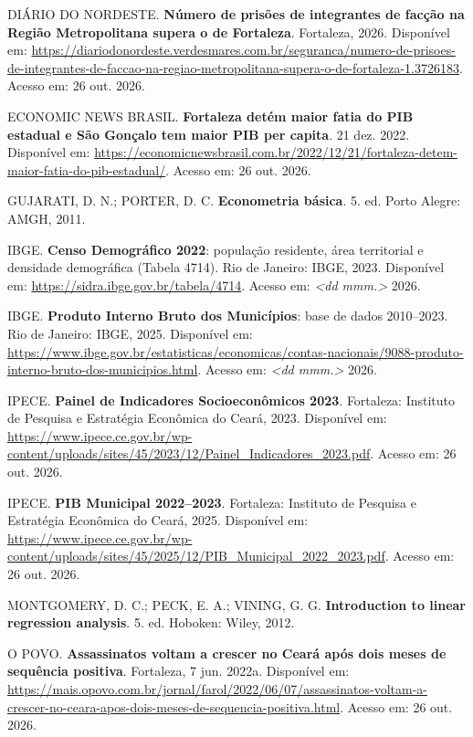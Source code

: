 \documentclass[12pt,a4paper]{article}
\begin{document}
\begin{description}
		\item DIÁRIO DO NORDESTE. \textbf{Número de prisões de integrantes de facção na Região Metropolitana supera o de Fortaleza}. Fortaleza, 2026. Disponível em: \url{https://diariodonordeste.verdesmares.com.br/seguranca/numero-de-prisoes-de-integrantes-de-faccao-na-regiao-metropolitana-supera-o-de-fortaleza-1.3726183}. Acesso em: 26 out. 2026.
		
		\item ECONOMIC NEWS BRASIL. \textbf{Fortaleza detém maior fatia do PIB estadual e São Gonçalo tem maior PIB per capita}. 21 dez. 2022. Disponível em: \url{https://economicnewsbrasil.com.br/2022/12/21/fortaleza-detem-maior-fatia-do-pib-estadual/}. Acesso em: 26 out. 2026.
		
		\item GUJARATI, D. N.; PORTER, D. C. \textbf{Econometria básica}. 5. ed. Porto Alegre: AMGH, 2011.
		
		\item IBGE. \textbf{Censo Demográfico 2022}: população residente, área territorial e densidade demográfica (Tabela 4714). Rio de Janeiro: IBGE, 2023. Disponível em: \url{https://sidra.ibge.gov.br/tabela/4714}. Acesso em: \textit{<dd mmm.>} 2026.
		
		\item IBGE. \textbf{Produto Interno Bruto dos Municípios}: base de dados 2010--2023. Rio de Janeiro: IBGE, 2025. Disponível em: \url{https://www.ibge.gov.br/estatisticas/economicas/contas-nacionais/9088-produto-interno-bruto-dos-municipios.html}. Acesso em: \textit{<dd mmm.>} 2026.
		
		\item IPECE. \textbf{Painel de Indicadores Socioeconômicos 2023}. Fortaleza: Instituto de Pesquisa e Estratégia Econômica do Ceará, 2023. Disponível em: \url{https://www.ipece.ce.gov.br/wp-content/uploads/sites/45/2023/12/Painel_Indicadores_2023.pdf}. Acesso em: 26 out. 2026.
		
		\item IPECE. \textbf{PIB Municipal 2022--2023}. Fortaleza: Instituto de Pesquisa e Estratégia Econômica do Ceará, 2025. Disponível em: \url{https://www.ipece.ce.gov.br/wp-content/uploads/sites/45/2025/12/PIB_Municipal_2022_2023.pdf}. Acesso em: 26 out. 2026.
		
		\item MONTGOMERY, D. C.; PECK, E. A.; VINING, G. G. \textbf{Introduction to linear regression analysis}. 5. ed. Hoboken: Wiley, 2012.
		
		\item O POVO. \textbf{Assassinatos voltam a crescer no Ceará após dois meses de sequência positiva}. Fortaleza, 7 jun. 2022a. Disponível em: \url{https://mais.opovo.com.br/jornal/farol/2022/06/07/assassinatos-voltam-a-crescer-no-ceara-apos-dois-meses-de-sequencia-positiva.html}. Acesso em: 26 out. 2026.
		

\end{description}
\end{document}
